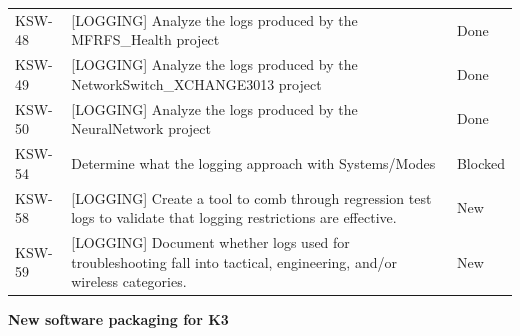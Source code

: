 \documentclass[letterpaper,11pt]{texMemo} %
\begin{document}
\begin{table}[h]
{\begin{tabular}{p{1in}p{6in}p{1in}}
KSW-48 & {[}LOGGING{]} Analyze the logs produced by the MFRFS\_Health project                                                      & Done    \\
KSW-49 & {[}LOGGING{]} Analyze the logs produced by the NetworkSwitch\_XCHANGE3013 project                                         & Done    \\
KSW-50 & {[}LOGGING{]} Analyze the logs produced by the NeuralNetwork project                                                      & Done    \\
KSW-54 & Determine what the logging approach with Systems/Modes                                                                    & Blocked \\
KSW-58 & {[}LOGGING{]} Create a tool to comb through regression test logs to validate that logging restrictions are effective.     & New     \\
KSW-59 & {[}LOGGING{]} Document whether logs used for troubleshooting fall into tactical, engineering, and/or wireless categories. & New
\end{tabular}%
}
\end{table}
%
\newpage
\textbf{New software packaging for K3}
\begin{table}[h]
\end{table}
\end{document}
